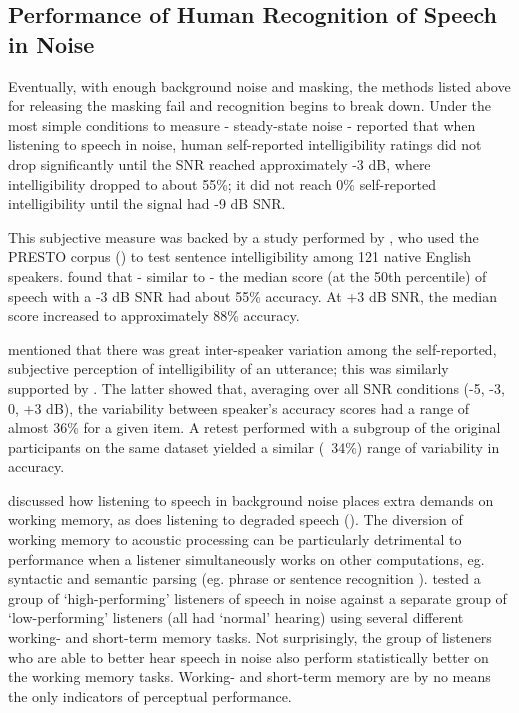 \subsection{Performance of Human Recognition of Speech in Noise}

Eventually, with enough background noise and masking, the methods listed above for releasing the masking fail and recognition begins to break down.  Under the most simple conditions to measure - steady-state noise - \cite{ding:13} reported that when listening to speech in noise, human self-reported intelligibility ratings did not drop significantly until the SNR reached approximately -3 dB, where intelligibility dropped to about 55\%;  it did not reach 0\% self-reported intelligibility until the signal had -9 dB SNR.

This subjective measure was backed by a study performed by \cite{gilbert:13}, who used the PRESTO corpus (\cite{garofolo:93}) to test sentence intelligibility among 121 native English speakers.  \cite{gilbert:13} found that - similar to \cite{ding:13} - the median score (at the 50th percentile) of speech with a -3 dB SNR had about 55\% accuracy.  At +3 dB SNR, the median score increased to approximately 88\% accuracy.

\cite{ding:13} mentioned that there was great inter-speaker variation among the self-reported, subjective perception of intelligibility of an utterance; this was similarly supported by \cite{gilbert:13}. The latter showed that, averaging over all SNR conditions (-5, -3, 0, +3 dB), the variability between speaker's accuracy scores had a range of almost 36\% for a given item.  A retest performed with a subgroup of the original participants on the same dataset yielded a similar (~34\%) range of variability in accuracy.  

\cite{francis:10} discussed how listening to speech in background noise places extra demands on working memory, as does listening to degraded speech (\cite{francis:09}).  The diversion of working memory to acoustic processing can be particularly detrimental to performance when a listener simultaneously works on other computations, eg. syntactic and semantic parsing (eg. phrase or sentence recognition \cite{caplan:99}). \cite{tamati:13} tested a group of `high-performing' listeners of speech in noise against a separate group of `low-performing' listeners (all had `normal' hearing) using several different working- and short-term memory tasks.  Not surprisingly, the group of listeners who are able to better hear speech in noise also perform statistically better on the working memory tasks.  Working- and short-term memory are by no means the only indicators of perceptual performance.


